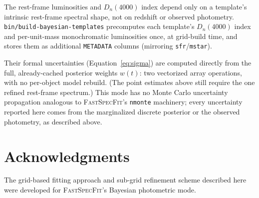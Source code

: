 \documentclass[12pt]{article}
\begin{document}
The rest-frame luminosities and $D_n(4000)$ index depend only on a
template's intrinsic rest-frame spectral shape, not on redshift or
observed photometry. \texttt{bin/build-bayesian-templates} precomputes
each template's $D_n(4000)$ index and per-unit-mass monochromatic
luminosities once, at grid-build time, and stores them as additional
\texttt{METADATA} columns (mirroring \texttt{sfr}/\texttt{mstar}).

Their formal uncertainties (Equation~\ref{eq:sigma}) are computed directly
from the full, already-cached posterior weights $w(t)$: two vectorized
array operations, with no per-object model rebuild. (The point estimates
above still require the one refined rest-frame spectrum.) This mode has
no Monte Carlo uncertainty propagation analogous to \textsc{FastSpecFit}'s
\texttt{nmonte} machinery; every uncertainty reported here comes from the
marginalized discrete posterior or the observed photometry, as described
above.

\section*{Acknowledgments}

The grid-based fitting approach and sub-grid refinement scheme described
here were developed for \textsc{FastSpecFit}'s Bayesian photometric mode.
\end{document}
